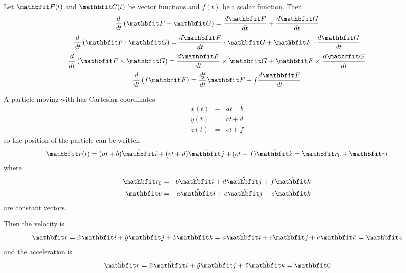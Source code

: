 Let $\vect{F}(t)$ and $\vect{G}(t)$ be vector functions and $f(t)$ be a
scalar function.  Then
$$\dbd{t}\left(\vect{F}+\vect{G}\right)=\der{\vect{F}}{t}+\der{\vect{G}}{t}$$
$$\dbd{t}\left(\vect{F}\cdot\vect{G}\right)=\der{\vect{F}}{t}\cdot\vect{G}
+\vect{F}\cdot\der{\vect{G}}{t}$$
$$\dbd{t}\left(\vect{F}\times\vect{G}\right)=\der{\vect{F}}{t}\times\vect{G}
+\vect{F}\times\der{\vect{G}}{t}$$
$$\dbd{t}\left(f\vect{F}\right)=\der{f}{t}\vect{F}+f\der{\vect{F}}{t}$$

\begin{example}
A particle moving with  has Cartesian 
coordinates
\begin{eqnarray*}
x(t)&=&at+b\\
y(t)&=&ct+d\\
z(t)&=&et+f
\end{eqnarray*}
so the position of the particle can be written
$$\vect{r}(t)=(at+b)\ivect+(ct+d)\jvect+(et+f)\kvect=\vect{r}_0+\vect{v}t$$
where
\begin{eqnarray*}
\vect{r}_0&=&b\ivect+d\jvect+f\kvect \\
\vect{v}&=&a\ivect+c\jvect+e\kvect 
\end{eqnarray*}
are constant vectors.

Then the velocity is
$$\dot{\vect{r}}=\dot{x}\ivect+\dot{y}\jvect+\dot{z}\kvect
=a\ivect+c\jvect+e\kvect=\vect{v}$$
and the acceleration is
$$\ddot{\vect{r}}=\ddot{x}\ivect+\ddot{y}\jvect+\ddot{z}\kvect
=\vect{0}$$
\end{example}

